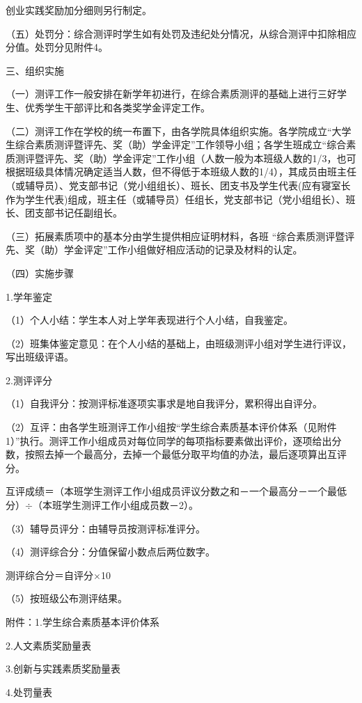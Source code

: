 \documentclass[UTF8,12pt,a4paper]{report}
\begin{document}
创业实践奖励加分细则另行制定。

（五）处罚分：综合测评时学生如有处罚及违纪处分情况，从综合测评中扣除相应分值。处罚分见附件4。

三、组织实施

（一）测评工作一般安排在新学年初进行，在综合素质测评的基础上进行三好学生、优秀学生干部评比和各类奖学金评定工作。

（二）测评工作在学校的统一布置下，由各学院具体组织实施。各学院成立“大学生综合素质测评暨评先、奖（助）学金评定”工作领导小组；各学生班成立“综合素质测评暨评先、奖（助）学金评定”工作小组（人数一般为本班级人数的1/3，也可根据班级具体情况确定适当人数，但不得低于本班级人数的1/4），其成员由班主任（或辅导员）、党支部书记（党小组组长）、班长、团支书及学生代表(应有寝室长作为学生代表)组成，班主任（或辅导员）任组长，党支部书记（党小组组长）、班长、团支部书记任副组长。

（三）拓展素质项中的基本分由学生提供相应证明材料，各班 “综合素质测评暨评先、奖（助）学金评定”工作小组做好相应活动的记录及材料的认定。

（四）实施步骤

1.学年鉴定

（1）个人小结：学生本人对上学年表现进行个人小结，自我鉴定。

（2）班集体鉴定意见：在个人小结的基础上，由班级测评小组对学生进行评议，写出班级评语。

2.测评评分

（1）自我评分：按测评标准逐项实事求是地自我评分，累积得出自评分。

（2）互评：由各学生班测评工作小组按“学生综合素质基本评价体系（见附件1）”执行。测评工作小组成员对每位同学的每项指标要素做出评价，逐项给出分数，按照去掉一个最高分，去掉一个最低分取平均值的办法，最后逐项算出互评分。

互评成绩＝（本班学生测评工作小组成员评议分数之和－一个最高分－一个最低分）$\div$（本班学生测评工作小组成员数－2）。

（3）辅导员评分：由辅导员按测评标准评分。

（4）测评综合分：分值保留小数点后两位数字。

测评综合分＝自评分$\times$10%

（5）按班级公布测评结果。

附件：1.学生综合素质基本评价体系

2.人文素质奖励量表

3.创新与实践素质奖励量表

4.处罚量表 
\end{document}
